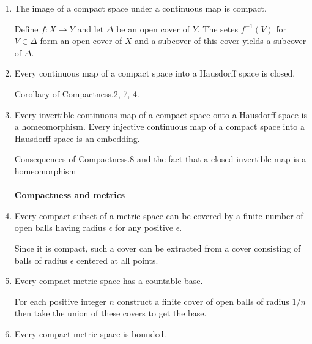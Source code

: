 \documentclass{article}
\begin{document}
\begin{enumerate}
Let \(U_{1},U_{2},...\) be the given cover. If none of the sets \(\bigcup_{i=1}^{m}U_{i}\) covers \(A\), pick a point from each set \(A\backslash \bigcup_{i=1}^{m}U_{i}\) distinctly and denote the set \(Y\).
Since each intersection \(Y\cap U_{i}\) is finite, they are closed in \(U_{i}\) respectively, so \(Y\) is closed (fundamental cover). In fact, by the same logic, all of its subsets are closed. 
Hence \(Y\) is compact \color{gray}(Compactness.2) \color{black} and discrete. However, this means \(Y\) is finite as if it is infinite a cover consisting of all points will not have a finite subcover. This contradicts the construction of \(Y\) that implies it is infinite.
\\\\
\textbf{Compactness and maps}
\item The image of a compact space under a continuous map is compact.

Define \(f:X\to Y\) and let \(\Delta\) be an open cover of \(Y\). The setes \(f^{-1}(V)\) for \(V\in\Delta\) form an open cover of \(X\) and a subcover of this cover yields a subcover of \(\Delta\).
\item Every continuous map of a compact space into a Hausdorff space is closed.

Corollary of \color{gray}Compactness.2, 7, 4\color{black}.
\item Every invertible continuous map of a compact space onto a Hausdorff space is a homeomorphism. Every injective continuous map of a compact space into a Hausdorff space is an embedding.

Consequences of \color{gray}Compactness.8 \color{black} and the fact that a closed invertible map is a homeomorphism
\\\\
\textbf{Compactness and metrics}
\item Every compact subset of a metric space can be covered by a finite number of open balls having radius \(\epsilon\) for any positive \(\epsilon\).

Since it is compact, such a cover can be extracted from a cover consisting of balls of radius \(\epsilon\) centered at all points.
\item Every compact metric space has a countable base.

For each positive integer \(n\) construct a finite cover of open balls of radius \(1/n\) then take the union of these covers to get the base.
\item Every compact metric space is bounded.


\end{enumerate}
\end{document}
